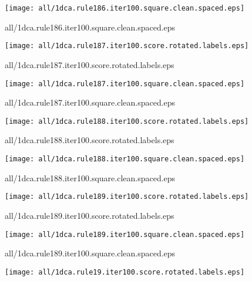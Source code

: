 \documentclass{article}
\begin{document}
\begin{center}
\begin{minipage}{\textwidth}
\texttt{[image: all/1dca.rule186.iter100.square.clean.spaced.eps]}
\end{minipage}
\end{center}
{\footnotesize all/1dca.rule186.iter100.square.clean.spaced.eps}
\begin{center}
\begin{minipage}{\textwidth}
\texttt{[image: all/1dca.rule187.iter100.score.rotated.labels.eps]}
\end{minipage}
\end{center}
{\footnotesize all/1dca.rule187.iter100.score.rotated.labels.eps}
\begin{center}
\begin{minipage}{\textwidth}
\texttt{[image: all/1dca.rule187.iter100.square.clean.spaced.eps]}
\end{minipage}
\end{center}
{\footnotesize all/1dca.rule187.iter100.square.clean.spaced.eps}
\begin{center}
\begin{minipage}{\textwidth}
\texttt{[image: all/1dca.rule188.iter100.score.rotated.labels.eps]}
\end{minipage}
\end{center}
{\footnotesize all/1dca.rule188.iter100.score.rotated.labels.eps}
\begin{center}
\begin{minipage}{\textwidth}
\texttt{[image: all/1dca.rule188.iter100.square.clean.spaced.eps]}
\end{minipage}
\end{center}
{\footnotesize all/1dca.rule188.iter100.square.clean.spaced.eps}
\begin{center}
\begin{minipage}{\textwidth}
\texttt{[image: all/1dca.rule189.iter100.score.rotated.labels.eps]}
\end{minipage}
\end{center}
{\footnotesize all/1dca.rule189.iter100.score.rotated.labels.eps}
\begin{center}
\begin{minipage}{\textwidth}
\texttt{[image: all/1dca.rule189.iter100.square.clean.spaced.eps]}
\end{minipage}
\end{center}
{\footnotesize all/1dca.rule189.iter100.square.clean.spaced.eps}
\begin{center}
\begin{minipage}{\textwidth}
\texttt{[image: all/1dca.rule19.iter100.score.rotated.labels.eps]}
\end{minipage}
\end{center}
\end{document}
